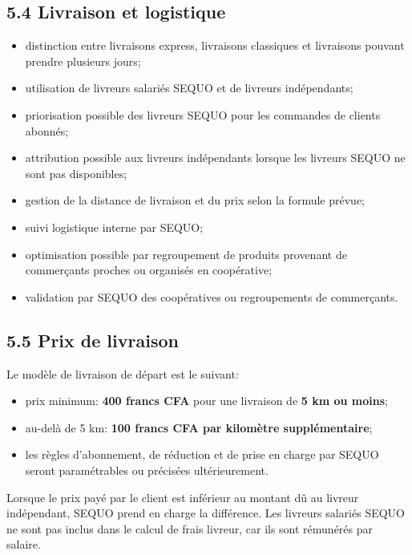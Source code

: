 \documentclass[11pt,a4paper]{article}
\begin{document}
\subsection*{5.4 Livraison et logistique}

\begin{itemize}
    \item distinction entre livraisons express, livraisons classiques et livraisons pouvant prendre plusieurs jours;
    \item utilisation de livreurs salariés SEQUO et de livreurs indépendants;
    \item priorisation possible des livreurs SEQUO pour les commandes de clients abonnés;
    \item attribution possible aux livreurs indépendants lorsque les livreurs SEQUO ne sont pas disponibles;
    \item gestion de la distance de livraison et du prix selon la formule prévue;
    \item suivi logistique interne par SEQUO;
    \item optimisation possible par regroupement de produits provenant de commerçants proches ou organisés en coopérative;
    \item validation par SEQUO des coopératives ou regroupements de commerçants.
\end{itemize}

\subsection*{5.5 Prix de livraison}

Le modèle de livraison de départ est le suivant:

\begin{itemize}
    \item prix minimum: \textbf{400 francs CFA} pour une livraison de \textbf{5 km ou moins};
    \item au-delà de 5 km: \textbf{100 francs CFA par kilomètre supplémentaire};
    \item les règles d'abonnement, de réduction et de prise en charge par SEQUO seront paramétrables ou précisées ultérieurement.
\end{itemize}

Lorsque le prix payé par le client est inférieur au montant dû au livreur indépendant, SEQUO prend en charge la différence. Les livreurs salariés SEQUO ne sont pas inclus dans le calcul de frais livreur, car ils sont rémunérés par salaire.
\end{document}
